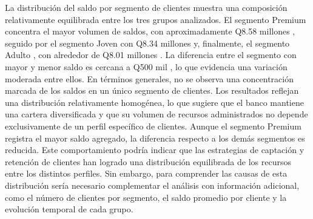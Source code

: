 La distribución del saldo por segmento de clientes muestra una composición relativamente equilibrada entre los tres grupos analizados. El segmento
Premium
concentra el mayor volumen de saldos, con aproximadamente
Q8.58 millones
, seguido por el segmento
Joven
con
Q8.34 millones
y, finalmente, el segmento
Adulto
, con alrededor de
Q8.01 millones
. La diferencia entre el segmento con mayor y menor saldo es cercana a
Q500 mil
, lo que evidencia una variación moderada entre ellos.
En términos generales, no se observa una concentración marcada de los saldos en un único segmento de clientes. Los resultados reflejan una distribución relativamente homogénea, lo que sugiere que el banco mantiene una cartera diversificada y que su volumen de recursos administrados no depende exclusivamente de un perfil específico de clientes.
Aunque el segmento
Premium
registra el mayor saldo agregado, la diferencia respecto a los demás segmentos es reducida. Este comportamiento podría indicar que las estrategias de captación y retención de clientes han logrado una distribución equilibrada de los recursos entre los distintos perfiles. Sin embargo, para comprender las causas de esta distribución sería necesario complementar el análisis con información adicional, como el número de clientes por segmento, el saldo promedio por cliente y la evolución temporal de cada grupo.